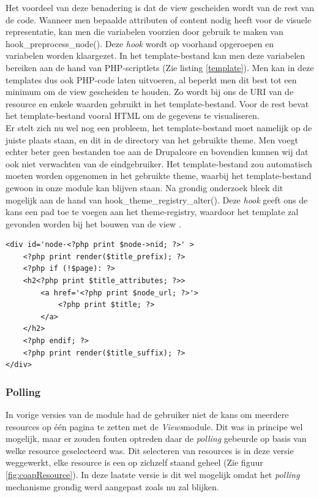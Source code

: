 Het voordeel van deze benadering is dat de view gescheiden wordt van de rest van de code. Wanneer men bepaalde attributen of content nodig heeft voor de visuele representatie, kan men die variabelen voorzien door gebruik te maken van hook\_preprocess\_node(). Deze \textit{hook} wordt op voorhand opgeroepen en variabelen worden klaargezet. In het template-bestand kan men deze variabelen bereiken aan de hand van PHP-scriptlets (Zie listing \ref{template}). Men kan in deze templates dus ook PHP-code laten uitvoeren, al beperkt men dit best tot een minimum om de view gescheiden te houden. Zo wordt bij ons de URI van de resource en enkele waarden gebruikt in het template-bestand. Voor de rest bevat het template-bestand vooral HTML om de gegevens te visualiseren.\\

Er stelt zich nu wel nog een probleem, het template-bestand moet namelijk op de juiste plaats staan, en dit in de directory van het gebruikte theme. Men voegt echter beter geen bestanden toe aan de Drupalcore en bovendien kunnen wij dat ook niet verwachten van de eindgebruiker. Het template-bestand zou automatisch moeten worden opgenomen in het gebruikte theme, waarbij het template-bestand gewoon in onze module kan blijven staan. Na grondig onderzoek bleek dit mogelijk aan de hand van hook\_theme\_registry\_alter(). Deze \textit{hook} geeft ons de kans een pad toe te voegen aan het theme-registry, waardoor het template zal gevonden worden bij het bouwen van de view \cite{addTemplate}.

\scriptsize
\lstset{language=HTML}
\begin{lstlisting}[label=template,caption=Voorbeeld van een template met PHP-scriptlets (node.tpl.php)]
<div id='node-<?php print $node->nid; ?>' >
	<?php print render($title_prefix); ?>
	<?php if (!$page): ?>
	<h2<?php print $title_attributes; ?>>
		<a href='<?php print $node_url; ?>'>
			<?php print $title; ?>
		</a>
	</h2>
	<?php endif; ?>
	<?php print render($title_suffix); ?>
</div>
\end{lstlisting}
\normalsize
\noindent

\subsubsection{Polling}\label{polling}
In vorige versies van de module had de gebruiker niet de kans om meerdere resources op \'{e}\'{e}n pagina te zetten met de \textit{Views}module. Dit was in principe wel mogelijk, maar er zouden fouten optreden daar de \textit{polling} gebeurde op basis van welke resource geselecteerd was. Dit selecteren van resources is in deze versie weggewerkt, elke resource is een op zichzelf staand geheel (Zie figuur \ref{fig:coapResource}). In deze laatste versie is dit wel mogelijk omdat het \textit{polling} mechanisme grondig werd aangepast zoals nu zal blijken.\\

